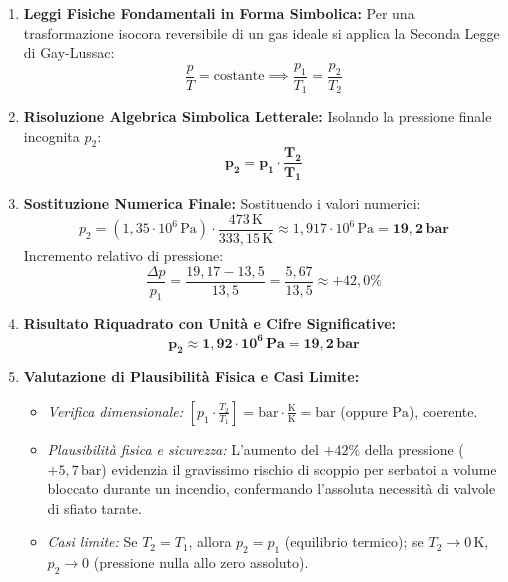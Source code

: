 \documentclass[11pt,a4paper,oneside]{report}
\begin{document}
\begin{problema}
\begin{enumerate}[label=\textbf{Fase \arabic*:}, leftmargin=*, itemsep=5pt]
  \item \textbf{Leggi Fisiche Fondamentali in Forma Simbolica:}
  Per una trasformazione isocora reversibile di un gas ideale si applica la Seconda Legge di Gay-Lussac:
  \[
  \frac{p}{T} = \text{costante} \implies \frac{p_1}{T_1} = \frac{p_2}{T_2}
  \]

  \item \textbf{Risoluzione Algebrica Simbolica Letterale:}
  Isolando la pressione finale incognita $p_2$:
  \[
  \mathbf{p_2 = p_1 \cdot \frac{T_2}{T_1}}
  \]

  \item \textbf{Sostituzione Numerica Finale:}
  Sostituendo i valori numerici:
  \[
  p_2 = (1{,}35 \cdot 10^6\,\text{Pa}) \cdot \frac{473\,\text{K}}{333{,}15\,\text{K}} \approx 1{,}917 \cdot 10^6\,\text{Pa} = \mathbf{19{,}2\,\text{bar}}
  \]
  Incremento relativo di pressione:
  \[
  \frac{\Delta p}{p_1} = \frac{19{,}17 - 13{,}5}{13{,}5} = \frac{5{,}67}{13{,}5} \approx +42{,}0\%
  \]

  \item \textbf{Risultato Riquadrato con Unit\`a e Cifre Significative:}
  \[
  \mathbf{\boxed{p_2 \approx 1{,}92 \cdot 10^6\,\text{Pa} = 19{,}2\,\text{bar}}}
  \]

  \item \textbf{Valutazione di Plausibilit\`a Fisica e Casi Limite:}
  \begin{itemize}[leftmargin=*, label=\textbullet]
    \item \textit{Verifica dimensionale:} $\left[p_1 \cdot \frac{T_2}{T_1}\right] = \text{bar} \cdot \frac{\text{K}}{\text{K}} = \text{bar}$ (oppure $\text{Pa}$), coerente.
    \item \textit{Plausibilit\`a fisica e sicurezza:} L'aumento del $+42\%$ della pressione ($+5{,}7\,\text{bar}$) evidenzia il gravissimo rischio di scoppio per serbatoi a volume bloccato durante un incendio, confermando l'assoluta necessit\`a di valvole di sfiato tarate.
    \item \textit{Casi limite:} Se $T_2 = T_1$, allora $p_2 = p_1$ (equilibrio termico); se $T_2 \to 0\,\text{K}$, $p_2 \to 0$ (pressione nulla allo zero assoluto).
  \end{itemize}
\end{enumerate}
\end{problema}

\newpage
\end{document}
